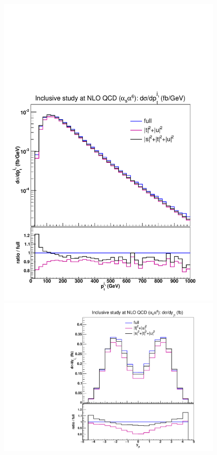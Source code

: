 \begin{figure}[hbt]
\centering
{\includegraphics[scale=0.35]{figures/scanfigures/ptj1_nlo.pdf}}
{\includegraphics[scale=0.35]{figures/scanfigures/yj1_nlo.pdf}}

\end{figure}
